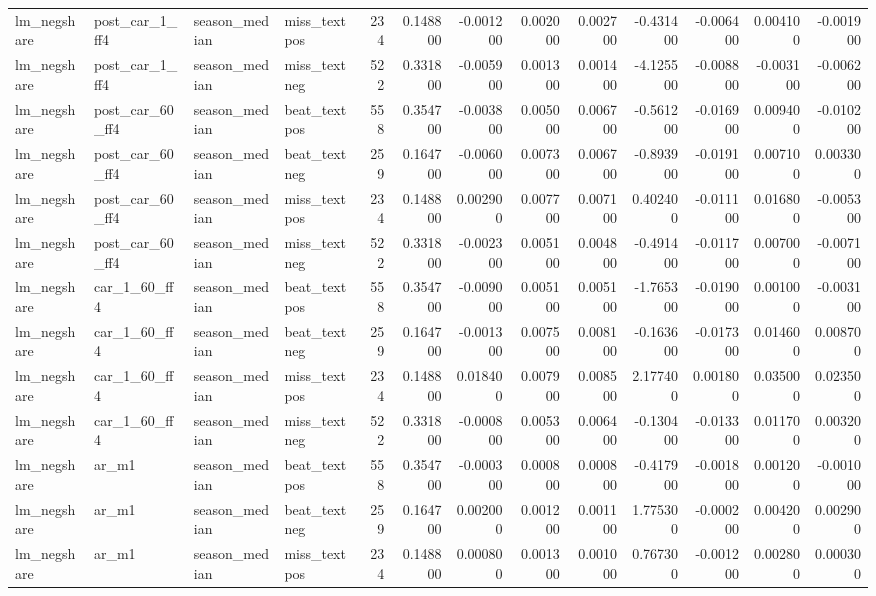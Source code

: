 \begin{table}
\begin{tabular}{llllrrrrrrrrr}
lm\_negshare & post\_car\_1\_ff4 & season\_median & miss\_textpos & 234 & 0.148800 & -0.001200 & 0.002000 & 0.002700 & -0.431400 & -0.006400 & 0.004100 & -0.001900 \\
lm\_negshare & post\_car\_1\_ff4 & season\_median & miss\_textneg & 522 & 0.331800 & -0.005900 & 0.001300 & 0.001400 & -4.125500 & -0.008800 & -0.003100 & -0.006200 \\
lm\_negshare & post\_car\_60\_ff4 & season\_median & beat\_textpos & 558 & 0.354700 & -0.003800 & 0.005000 & 0.006700 & -0.561200 & -0.016900 & 0.009400 & -0.010200 \\
lm\_negshare & post\_car\_60\_ff4 & season\_median & beat\_textneg & 259 & 0.164700 & -0.006000 & 0.007300 & 0.006700 & -0.893900 & -0.019100 & 0.007100 & 0.003300 \\
lm\_negshare & post\_car\_60\_ff4 & season\_median & miss\_textpos & 234 & 0.148800 & 0.002900 & 0.007700 & 0.007100 & 0.402400 & -0.011100 & 0.016800 & -0.005300 \\
lm\_negshare & post\_car\_60\_ff4 & season\_median & miss\_textneg & 522 & 0.331800 & -0.002300 & 0.005100 & 0.004800 & -0.491400 & -0.011700 & 0.007000 & -0.007100 \\
lm\_negshare & car\_1\_60\_ff4 & season\_median & beat\_textpos & 558 & 0.354700 & -0.009000 & 0.005100 & 0.005100 & -1.765300 & -0.019000 & 0.001000 & -0.003100 \\
lm\_negshare & car\_1\_60\_ff4 & season\_median & beat\_textneg & 259 & 0.164700 & -0.001300 & 0.007500 & 0.008100 & -0.163600 & -0.017300 & 0.014600 & 0.008700 \\
lm\_negshare & car\_1\_60\_ff4 & season\_median & miss\_textpos & 234 & 0.148800 & 0.018400 & 0.007900 & 0.008500 & 2.177400 & 0.001800 & 0.035000 & 0.023500 \\
lm\_negshare & car\_1\_60\_ff4 & season\_median & miss\_textneg & 522 & 0.331800 & -0.000800 & 0.005300 & 0.006400 & -0.130400 & -0.013300 & 0.011700 & 0.003200 \\
lm\_negshare & ar\_m1 & season\_median & beat\_textpos & 558 & 0.354700 & -0.000300 & 0.000800 & 0.000800 & -0.417900 & -0.001800 & 0.001200 & -0.001000 \\
lm\_negshare & ar\_m1 & season\_median & beat\_textneg & 259 & 0.164700 & 0.002000 & 0.001200 & 0.001100 & 1.775300 & -0.000200 & 0.004200 & 0.002900 \\
lm\_negshare & ar\_m1 & season\_median & miss\_textpos & 234 & 0.148800 & 0.000800 & 0.001300 & 0.001000 & 0.767300 & -0.001200 & 0.002800 & 0.000300 \\

\end{tabular}
\end{table}
